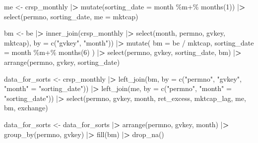 \documentclass[
]{book}
\newenvironment{Shaded}{\begin{snugshade}}{\end{snugshade}}
\newcommand{\AttributeTok}[1]{\textcolor[rgb]{0.61,0.61,0.61}{#1}}
\newcommand{\DecValTok}[1]{\textcolor[rgb]{0.06,0.06,0.06}{#1}}
\newcommand{\ErrorTok}[1]{\textcolor[rgb]{0.14,0.14,0.14}{\textbf{#1}}}
\newcommand{\FunctionTok}[1]{\textcolor[rgb]{0,0,0}{#1}}
\newcommand{\NormalTok}[1]{#1}
\newcommand{\OtherTok}[1]{\textcolor[rgb]{0.37,0.37,0.37}{#1}}
\newcommand{\SpecialCharTok}[1]{\textcolor[rgb]{0,0,0}{#1}}
\newcommand{\StringTok}[1]{\textcolor[rgb]{0.5,0.5,0.5}{#1}}
\begin{document}
\begin{Shaded}
\begin{Highlighting}[]
\NormalTok{me }\OtherTok{\textless{}{-}}\NormalTok{ crsp\_monthly }\SpecialCharTok{|}\ErrorTok{\textgreater{}}
  \FunctionTok{mutate}\NormalTok{(}\AttributeTok{sorting\_date =}\NormalTok{ month }\SpecialCharTok{\%m+\%} \FunctionTok{months}\NormalTok{(}\DecValTok{1}\NormalTok{)) }\SpecialCharTok{|}\ErrorTok{\textgreater{}}
  \FunctionTok{select}\NormalTok{(permno, sorting\_date, }\AttributeTok{me =}\NormalTok{ mktcap)}

\NormalTok{bm }\OtherTok{\textless{}{-}}\NormalTok{ be }\SpecialCharTok{|}\ErrorTok{\textgreater{}}
  \FunctionTok{inner\_join}\NormalTok{(crsp\_monthly }\SpecialCharTok{|}\ErrorTok{\textgreater{}}
    \FunctionTok{select}\NormalTok{(month, permno, gvkey, mktcap), }\AttributeTok{by =} \FunctionTok{c}\NormalTok{(}\StringTok{"gvkey"}\NormalTok{, }\StringTok{"month"}\NormalTok{)) }\SpecialCharTok{|}\ErrorTok{\textgreater{}}
  \FunctionTok{mutate}\NormalTok{(}
    \AttributeTok{bm =}\NormalTok{ be }\SpecialCharTok{/}\NormalTok{ mktcap,}
    \AttributeTok{sorting\_date =}\NormalTok{ month }\SpecialCharTok{\%m+\%} \FunctionTok{months}\NormalTok{(}\DecValTok{6}\NormalTok{)}
\NormalTok{  ) }\SpecialCharTok{|}\ErrorTok{\textgreater{}}
  \FunctionTok{select}\NormalTok{(permno, gvkey, sorting\_date, bm) }\SpecialCharTok{|}\ErrorTok{\textgreater{}}
  \FunctionTok{arrange}\NormalTok{(permno, gvkey, sorting\_date)}

\NormalTok{data\_for\_sorts }\OtherTok{\textless{}{-}}\NormalTok{ crsp\_monthly }\SpecialCharTok{|}\ErrorTok{\textgreater{}}
  \FunctionTok{left\_join}\NormalTok{(bm, }\AttributeTok{by =} \FunctionTok{c}\NormalTok{(}\StringTok{"permno"}\NormalTok{, }\StringTok{"gvkey"}\NormalTok{, }\StringTok{"month"} \OtherTok{=} \StringTok{"sorting\_date"}\NormalTok{)) }\SpecialCharTok{|}\ErrorTok{\textgreater{}}
  \FunctionTok{left\_join}\NormalTok{(me, }\AttributeTok{by =} \FunctionTok{c}\NormalTok{(}\StringTok{"permno"}\NormalTok{, }\StringTok{"month"} \OtherTok{=} \StringTok{"sorting\_date"}\NormalTok{)) }\SpecialCharTok{|}\ErrorTok{\textgreater{}}
  \FunctionTok{select}\NormalTok{(permno, gvkey, month, ret\_excess, mktcap\_lag, me, bm, exchange)}

\NormalTok{data\_for\_sorts }\OtherTok{\textless{}{-}}\NormalTok{ data\_for\_sorts }\SpecialCharTok{|}\ErrorTok{\textgreater{}}
  \FunctionTok{arrange}\NormalTok{(permno, gvkey, month) }\SpecialCharTok{|}\ErrorTok{\textgreater{}}
  \FunctionTok{group\_by}\NormalTok{(permno, gvkey) }\SpecialCharTok{|}\ErrorTok{\textgreater{}}
  \FunctionTok{fill}\NormalTok{(bm) }\SpecialCharTok{|}\ErrorTok{\textgreater{}}
  \FunctionTok{drop\_na}\NormalTok{()}
\end{Highlighting}
\end{Shaded}
\end{document}

